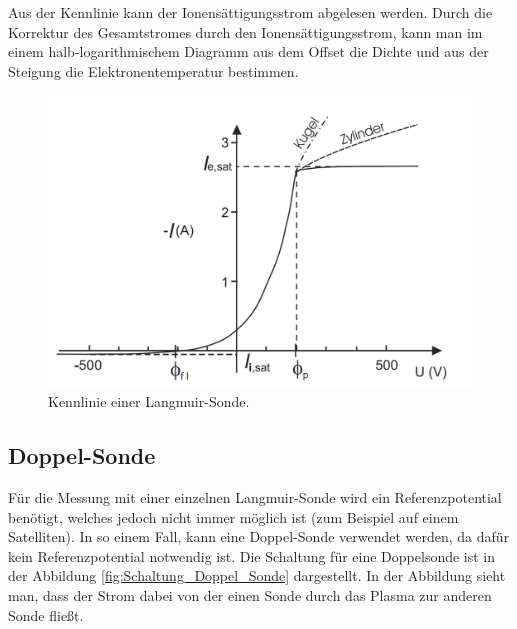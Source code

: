 Aus der Kennlinie kann der Ionensättigungsstrom abgelesen werden. Durch die Korrektur des Gesamtstromes durch den Ionensättigungsstrom, kann man im einem halb-logarithmischem Diagramm aus dem Offset die  Dichte und aus der Steigung die Elektronentemperatur bestimmen. 
\begin{figure}[H]
\centering
\includegraphics[scale=0.4]{Kennlinie_Sonde.png}
\caption{Kennlinie einer Langmuir-Sonde. \cite{anleitung}}
\label{fig:Kennlinie_Sonde}
\end{figure}
\subsection{Doppel-Sonde}
Für die Messung mit einer einzelnen Langmuir-Sonde wird ein Referenzpotential benötigt, welches jedoch nicht immer möglich ist (zum Beispiel auf einem Satelliten). In so einem Fall, kann eine Doppel-Sonde \cite{anleitung} verwendet werden, da dafür kein Referenzpotential notwendig ist. Die Schaltung für eine Doppelsonde ist in der Abbildung \ref{fig:Schaltung_Doppel_Sonde} dargestellt. In der Abbildung sieht man, dass der Strom dabei von der einen Sonde durch das Plasma zur anderen Sonde fließt. 

